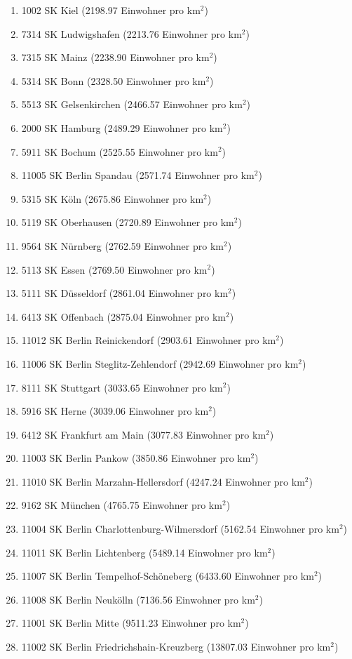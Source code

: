\begin{enumerate}[itemsep=-6mm]
\item 1002 SK Kiel (2198.97 Einwohner pro km$^2$)
\item 7314 SK Ludwigshafen (2213.76 Einwohner pro km$^2$)
\item 7315 SK Mainz (2238.90 Einwohner pro km$^2$)
\item 5314 SK Bonn (2328.50 Einwohner pro km$^2$)
\item 5513 SK Gelsenkirchen (2466.57 Einwohner pro km$^2$)
\item 2000 SK Hamburg (2489.29 Einwohner pro km$^2$)
\item 5911 SK Bochum (2525.55 Einwohner pro km$^2$)
\item 11005 SK Berlin Spandau (2571.74 Einwohner pro km$^2$)
\item 5315 SK Köln (2675.86 Einwohner pro km$^2$)
\item 5119 SK Oberhausen (2720.89 Einwohner pro km$^2$)
\item 9564 SK Nürnberg (2762.59 Einwohner pro km$^2$)
\item 5113 SK Essen (2769.50 Einwohner pro km$^2$)
\item 5111 SK Düsseldorf (2861.04 Einwohner pro km$^2$)
\item 6413 SK Offenbach (2875.04 Einwohner pro km$^2$)
\item 11012 SK Berlin Reinickendorf (2903.61 Einwohner pro km$^2$)
\item 11006 SK Berlin Steglitz-Zehlendorf (2942.69 Einwohner pro km$^2$)
\item 8111 SK Stuttgart (3033.65 Einwohner pro km$^2$)
\item 5916 SK Herne (3039.06 Einwohner pro km$^2$)
\item 6412 SK Frankfurt am Main (3077.83 Einwohner pro km$^2$)
\item 11003 SK Berlin Pankow (3850.86 Einwohner pro km$^2$)
\item 11010 SK Berlin Marzahn-Hellersdorf (4247.24 Einwohner pro km$^2$)
\item 9162 SK München (4765.75 Einwohner pro km$^2$)
\item 11004 SK Berlin Charlottenburg-Wilmersdorf (5162.54 Einwohner pro km$^2$)
\item 11011 SK Berlin Lichtenberg (5489.14 Einwohner pro km$^2$)
\item 11007 SK Berlin Tempelhof-Schöneberg (6433.60 Einwohner pro km$^2$)
\item 11008 SK Berlin Neukölln (7136.56 Einwohner pro km$^2$)
\item 11001 SK Berlin Mitte (9511.23 Einwohner pro km$^2$)
\item 11002 SK Berlin Friedrichshain-Kreuzberg (13807.03 Einwohner pro km$^2$)
\end{enumerate}